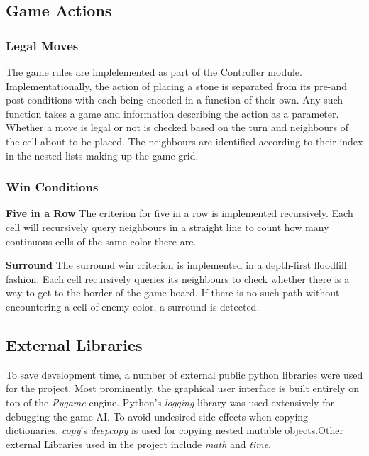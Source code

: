 \subsection{Game Actions}

\subsubsection{Legal Moves}
The game rules are implelemented as part of the Controller module. Implementationally, the action of placing a stone is separated from its pre-and post-conditions with each being encoded in a function of their own. Any such function takes a game and information describing the action as a parameter. 
Whether a move is legal or not is checked based on the turn and neighbours of the cell about to be placed. The neighbours are identified according to their index in the nested lists making up the game grid.


\subsubsection{Win Conditions}

\textbf{Five in a Row}
The criterion for five in a row is implemented recursively. Each cell will recursively query neighbours in a straight line to count how many continuous cells of the same color there are.

\textbf{Surround}
The surround win criterion is implemented in a depth-first floodfill fashion. Each cell recursively queries its neighbours to check whether there is a way to get to the border of the game board. If there is no such path without encountering a cell of enemy color, a surround is detected.


\subsection{External Libraries}
To save development time, a number of external public python libraries were used for the project. Most prominently, the graphical user interface is built entirely on top of the \textit{Pygame} engine. Python's \textit{logging} library was used extensively for debugging the game AI. To avoid undesired side-effects when copying dictionaries, \textit{copy}'s \textit{deepcopy} is used for copying nested mutable objects.Other external Libraries used in the project include \textit{math} and \textit{time}.